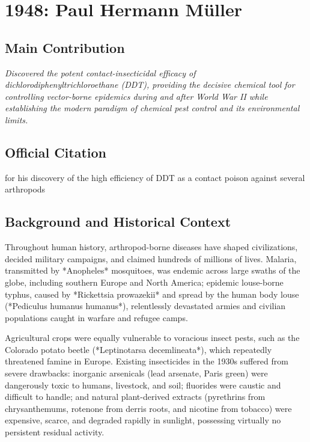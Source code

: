 \chapter[1948 --- Muller]{1948: Paul Hermann M\"uller}
\label{ch:1948_paulhermannmuller}

\section*{Main Contribution}

\textit{Discovered the potent contact-insecticidal efficacy of dichlorodiphenyltrichloroethane (DDT), providing the decisive chemical tool for controlling vector-borne epidemics during and after World War II while establishing the modern paradigm of chemical pest control and its environmental limits.}\cite{nobel-1948,lecture-1948,ddt-history,who-vector-control,carson-silent-spring}

\section{Official Citation}

for his discovery of the high efficiency of DDT as a contact poison against several arthropods

\section{Background and Historical Context}

Throughout human history, arthropod-borne diseases have shaped civilizations, decided military campaigns, and claimed hundreds of millions of lives. Malaria, transmitted by *Anopheles* mosquitoes, was endemic across large swaths of the globe, including southern Europe and North America; epidemic louse-borne typhus, caused by *Rickettsia prowazekii* and spread by the human body louse (*Pediculus humanus humanus*), relentlessly devastated armies and civilian populations caught in warfare and refugee camps. 

Agricultural crops were equally vulnerable to voracious insect pests, such as the Colorado potato beetle (*Leptinotarsa decemlineata*), which repeatedly threatened famine in Europe. Existing insecticides in the 1930s suffered from severe drawbacks: inorganic arsenicals (lead arsenate, Paris green) were dangerously toxic to humans, livestock, and soil; fluorides were caustic and difficult to handle; and natural plant-derived extracts (pyrethrins from chrysanthemums, rotenone from derris roots, and nicotine from tobacco) were expensive, scarce, and degraded rapidly in sunlight, possessing virtually no persistent residual activity.

